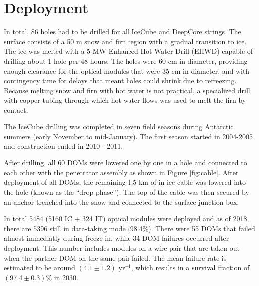 \section{Deployment}
\label{sec:deployment}
In total, 86 holes had to be drilled for all IceCube and DeepCore strings. The surface consists of a 50 m snow and firn region with a gradual transition to ice. The ice was melted with a 5 MW Enhanced Hot Water Drill (EHWD) capable of drilling about 1 hole per 48 hours. The holes were 60 cm in diameter, providing enough clearance for the optical modules that were 35 cm in diameter, and with contingency time for delays that meant holes could shrink due to refreezing. Because melting snow and firn with hot water is not practical, a specialized drill with copper tubing through which hot water flows was used to melt the firn by contact.

The IceCube drilling was completed in seven field seasons during Antarctic summers (early November to mid-January). The first season started in 2004-2005 and construction ended in 2010 - 2011. 

After drilling, all 60 DOMs were lowered one by one in a hole and connected to each other with the penetrator assembly as shown in Figure \ref{fig:cable}. After deployment of all DOMs, the remaining 1,\.5 km of in-ice cable was lowered into the hole (known as the ``drop phase''). The top of the cable was then secured by an anchor trenched into the snow and connected to the surface junction box. 

In total 5484 (5160 IC + 324 IT) optical modules were deployed and as of 2018, there are 5396 still in data-taking mode (98.4\%). There were 55 DOMs that failed almost immediatly during freeze-in, while 34 DOM failures occurred after deployment. This number includes modules on a wire pair that are taken out when the partner DOM on the same pair failed. The mean failure rate is estimated to be around $(4.1 \pm 1.2)$ yr$^{-1}$, which results in a survival fraction of $(97.4 \pm 0.3)\%$ in 2030.

